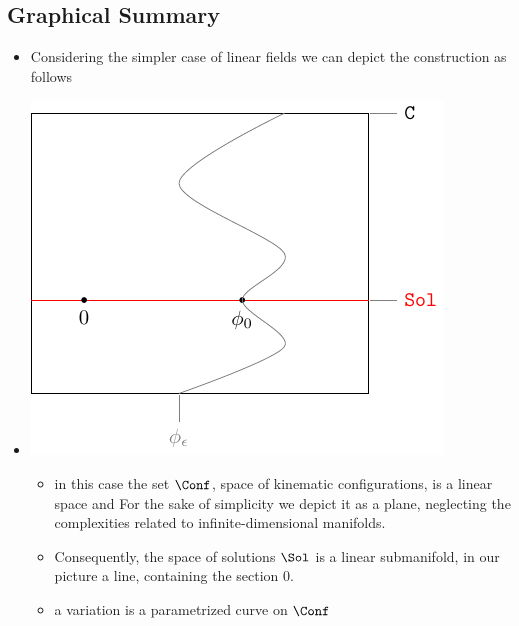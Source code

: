 \documentclass[a4paper,11pt]{scrartcl}
\begin{document}
    \subsection{Graphical Summary}
    \begin{itemize}
        \item Considering the simpler case of linear fields we can depict the construction as follows
        \item 
        \begin{minipage}{0.4\textwidth}
            \includegraphics[width=\textwidth]{../Pictures/GeometricPicture0}
        \end{minipage}
        \begin{minipage}{0.5\textwidth}
            \begin{itemize}
                \item in this case the set $\Conf$, space of kinematic configurations, is a linear space and 
                    For the sake of simplicity we depict it as a plane, neglecting the complexities related to infinite-dimensional manifolds.
                \item Consequently, the space of solutions $ \Sol$ is a linear submanifold, in our picture a line, containing the section $0$.
                \item a variation is a parametrized curve on $\Conf$
            \end{itemize}
        \end{minipage}


\end{itemize}
\end{document}

